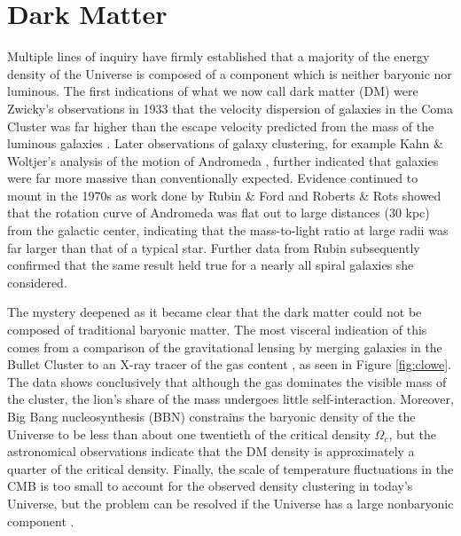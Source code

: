 \section{Dark Matter}
Multiple lines of inquiry have firmly established that a majority of the energy density of the Universe is composed of a component which is neither baryonic nor luminous. The first indications of what we now call dark matter (DM) were Zwicky's observations in 1933 that the velocity dispersion of galaxies in the Coma Cluster was far higher than the escape velocity predicted from the mass of the luminous galaxies \cite{zwicky_1933}. Later observations of galaxy clustering, for example Kahn \& Woltjer's analysis of the motion of Andromeda \cite{kahn_intergalactic_1959}, further indicated that galaxies were far more massive than conventionally expected. Evidence continued to mount in the 1970s as work done by Rubin \& Ford \cite{rubin_rotation_1970} and Roberts \& Rots \cite{roberts_comparison_1973} showed that the rotation curve of Andromeda was flat out to large distances (30 kpc) from the galactic center, indicating that the mass-to-light ratio at large radii was far larger than that of a typical star. Further data from Rubin \cite{rubin_extended_1978} subsequently confirmed that the same result held true for a nearly all spiral galaxies she considered. 
 
The mystery deepened as it became clear that the dark matter could not be composed of traditional baryonic matter. The most visceral indication of this comes from a comparison of the gravitational lensing by merging galaxies in the Bullet Cluster to an X-ray tracer of the gas content \cite{clowe_direct_2006}, as seen in Figure \ref{fig:clowe}. The data shows conclusively that although the gas dominates the visible mass of the cluster, the lion's share of the mass undergoes little self-interaction. Moreover, Big Bang nucleosynthesis (BBN) constrains the baryonic density of the the Universe to be less than about one twentieth of the critical density $\Omega_c$, but the astronomical observations indicate that the DM density is approximately a quarter of the critical density. Finally, the scale of temperature fluctuations in the CMB is too small to account for the observed density clustering in today's Universe, but the problem can be resolved if the Universe has a large nonbaryonic component \cite{einasto_dark_2009}.

